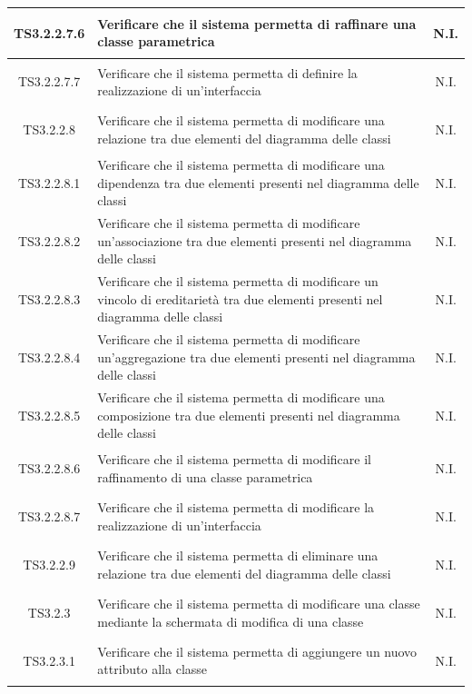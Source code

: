 \documentclass[../PianoDiQualifica.tex]{subfiles}
\begin{document}
\begin{longtable}{|c|>{\centering}p{10cm}|c|}
	\hline
	\hypertarget{TS3.2.2.7.6}{TS3.2.2.7.6} & Verificare che il sistema permetta di raffinare una classe parametrica & N.I. \\
	\hline
	\hypertarget{TS3.2.2.7.7}{TS3.2.2.7.7} & Verificare che il sistema permetta di definire la realizzazione di un'interfaccia & N.I. \\
	\hline
	\hypertarget{TS3.2.2.8}{TS3.2.2.8} & Verificare che il sistema permetta di modificare una relazione tra due elementi del diagramma delle classi & N.I. \\
	\hline
	\hypertarget{TS3.2.2.8.1}{TS3.2.2.8.1} & Verificare che il sistema permetta di modificare una dipendenza tra due elementi presenti nel diagramma delle classi & N.I. \\
	\hline
	\hypertarget{TS3.2.2.8.2}{TS3.2.2.8.2} & Verificare che il sistema permetta di modificare un'associazione tra due elementi presenti nel diagramma delle classi & N.I. \\
	\hline
	\hypertarget{TS3.2.2.8.3}{TS3.2.2.8.3} & Verificare che il sistema permetta di modificare un vincolo di ereditarietà tra due elementi presenti nel diagramma delle classi & N.I. \\
	\hline
	\hypertarget{TS3.2.2.8.4}{TS3.2.2.8.4} & Verificare che il sistema permetta di modificare un'aggregazione tra due elementi presenti nel diagramma delle classi & N.I. \\
	\hline
	\hypertarget{TS3.2.2.8.5}{TS3.2.2.8.5} & Verificare che il sistema permetta di modificare una composizione tra due elementi presenti nel diagramma delle classi & N.I. \\
	\hline
	\hypertarget{TS3.2.2.8.6}{TS3.2.2.8.6} & Verificare che il sistema permetta di modificare il raffinamento di una classe parametrica & N.I. \\
	\hline
	\hypertarget{TS3.2.2.8.7}{TS3.2.2.8.7} & Verificare che il sistema permetta di modificare la realizzazione di un'interfaccia & N.I. \\
	\hline
	\hypertarget{TS3.2.2.9}{TS3.2.2.9} & Verificare che il sistema permetta di eliminare una relazione tra due elementi del diagramma delle classi & N.I. \\
	\hline
	\hypertarget{TS3.2.3}{TS3.2.3} & Verificare che il sistema permetta di modificare una classe mediante la schermata di modifica di una classe & N.I. \\
	\hline
	\hypertarget{TS3.2.3.1}{TS3.2.3.1} & Verificare che il sistema permetta di aggiungere un nuovo attributo alla classe & N.I. \\

\end{longtable}
\end{document}
